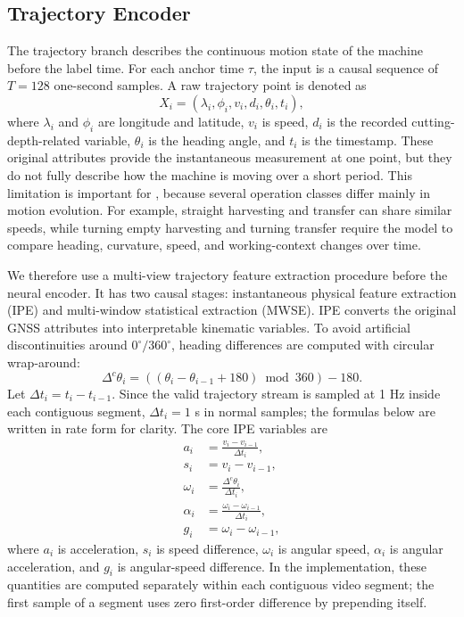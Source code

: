 \subsection{Trajectory Encoder}
\label{sec:trajectory_encoder}

The trajectory branch describes the continuous motion state of the machine before the label time. For each anchor time $\tau$, the input is a causal sequence of $T=128$ one-second samples. A raw trajectory point is denoted as
\begin{equation}
    X_i = (\lambda_i, \phi_i, v_i, d_i, \theta_i, t_i),
\end{equation}
where $\lambda_i$ and $\phi_i$ are longitude and latitude, $v_i$ is speed, $d_i$ is the recorded cutting-depth-related variable, $\theta_i$ is the heading angle, and $t_i$ is the timestamp. These original attributes provide the instantaneous measurement at one point, but they do not fully describe how the machine is moving over a short period. This limitation is important for \task{}, because several operation classes differ mainly in motion evolution. For example, straight harvesting and transfer can share similar speeds, while turning empty harvesting and turning transfer require the model to compare heading, curvature, speed, and working-context changes over time.

We therefore use a multi-view trajectory feature extraction procedure before the neural encoder. It has two causal stages: instantaneous physical feature extraction (IPE) and multi-window statistical extraction (MWSE). IPE converts the original GNSS attributes into interpretable kinematic variables. To avoid artificial discontinuities around $0^\circ/360^\circ$, heading differences are computed with circular wrap-around:
\begin{equation}
    \Delta^{c}\theta_i = ((\theta_i - \theta_{i-1} + 180) \bmod 360) - 180 .
\end{equation}
Let $\Delta t_i=t_i-t_{i-1}$. Since the valid trajectory stream is sampled at 1 Hz inside each contiguous segment, $\Delta t_i=1$ s in normal samples; the formulas below are written in rate form for clarity. The core IPE variables are
\begin{align}
    a_i &= \frac{v_i-v_{i-1}}{\Delta t_i}, \\
    s_i &= v_i-v_{i-1}, \\
    \omega_i &= \frac{\Delta^{c}\theta_i}{\Delta t_i}, \\
    \alpha_i &= \frac{\omega_i-\omega_{i-1}}{\Delta t_i}, \\
    g_i &= \omega_i-\omega_{i-1},
\end{align}
where $a_i$ is acceleration, $s_i$ is speed difference, $\omega_i$ is angular speed, $\alpha_i$ is angular acceleration, and $g_i$ is angular-speed difference. In the implementation, these quantities are computed separately within each contiguous video segment; the first sample of a segment uses zero first-order difference by prepending itself.

